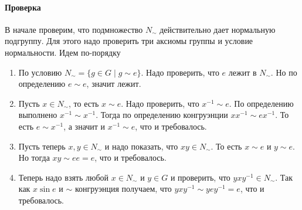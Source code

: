 \paragraph{Проверка}

\gitemreset
\gitem В начале проверим, что подмножество $N_\sim$ действительно дает нормальную подгруппу.
Для этого надо проверить три аксиомы группы и условие нормальности.
Идем по-порядку
\begin{enumerate}
\item По условию $N_\sim = \{g\in G\mid g\sim e\}$.
Надо проверить, что $e$ лежит в $N_\sim$.
Но по определению $e \sim e$, значит лежит.

\item Пусть $x\in N_\sim$, то есть $x\sim e$.
Надо проверить, что $x^{-1}\sim e$.
По определению выполнено $x^{-1}\sim x^{-1}$.
Тогда по определению конгруэнции $x x^{-1} \sim e x^{-1}$.
То есть $e \sim x^{-1}$, а значит и $x^{-1}\sim e$, что и требовалось.

\item Пусть теперь $x,y\in N_\sim$ и надо показать, что $xy \in N_\sim$.
То есть $x\sim e$ и $y\sim e$.
Но тогда $x y \sim e e = e$, что и требовалось.

\item Теперь надо взять любой $x\in N_\sim$ и $y\in G$ и проверить, что $yxy^{-1}\in N_\sim$.
Так как $x\sin e$ и $\sim$ конгруэнция получаем, что $yxy^{-1}\sim y e y^{-1} = e$, что и требовалось.
\end{enumerate}

